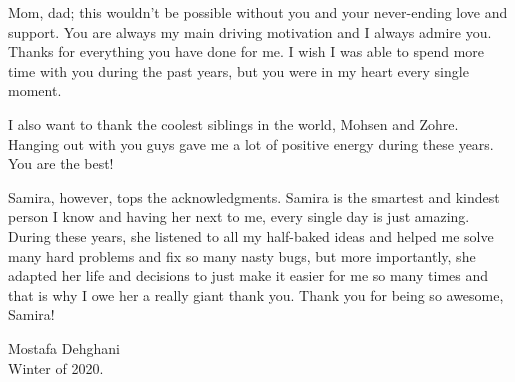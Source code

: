 Mom, dad; this wouldn't be possible without you and your never-ending love and support. You are always my main driving motivation and I always admire you. Thanks for everything you have done for me. I wish I was able to spend more time with you during the past years, but you were in my heart every single moment.

I also want to thank the coolest siblings in the world, Mohsen and Zohre. Hanging out with you guys gave me a lot of positive energy during these years. You are the best!

Samira, however, tops the acknowledgments. Samira is the smartest and kindest person I know and having her next to me, every single day is just amazing.  During these years, she listened to all my half-baked ideas and helped me solve many hard problems and fix so many nasty bugs, but more importantly, she adapted her life and decisions to just make it easier for me so many times and that is why I owe her a really giant thank you. Thank you for being so awesome, Samira!


\hfill 

Mostafa Dehghani\\
Winter of 2020.